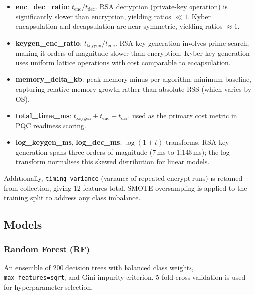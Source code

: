\documentclass[conference]{IEEEtran}
\begin{document}
\begin{itemize}
  \item \textbf{enc\_dec\_ratio}: $t_{\text{enc}} / t_{\text{dec}}$.
        RSA decryption (private-key operation) is significantly slower
        than encryption, yielding ratios $\ll 1$.
        Kyber encapsulation and decapsulation are near-symmetric,
        yielding ratios $\approx 1$.

  \item \textbf{keygen\_enc\_ratio}: $t_{\text{keygen}} / t_{\text{enc}}$.
        RSA key generation involves prime search, making it orders of
        magnitude slower than encryption.
        Kyber key generation uses uniform lattice operations with
        cost comparable to encapsulation.

  \item \textbf{memory\_delta\_kb}: peak memory minus per-algorithm
        minimum baseline, capturing relative memory growth rather than
        absolute RSS (which varies by OS).

  \item \textbf{total\_time\_ms}: $t_{\text{keygen}} + t_{\text{enc}} + t_{\text{dec}}$,
        used as the primary cost metric in PQC readiness scoring.

  \item \textbf{log\_keygen\_ms}, \textbf{log\_dec\_ms}:
        $\log(1 + t)$ transforms.
        RSA key generation spans three orders of magnitude
        (7\,ms to 1{,}148\,ms); the log transform normalises this
        skewed distribution for linear models.
\end{itemize}

Additionally, \texttt{timing\_variance} (variance of repeated encrypt
runs) is retained from collection, giving 12 features total.
SMOTE oversampling \cite{chawla2002smote} is applied to the training
split to address any class imbalance.

\subsection{Models}

\subsubsection{Random Forest (RF)}
An ensemble of 200 decision trees with balanced class weights,
\texttt{max\_features=sqrt}, and Gini impurity criterion.
5-fold cross-validation is used for hyperparameter selection.
\end{document}
